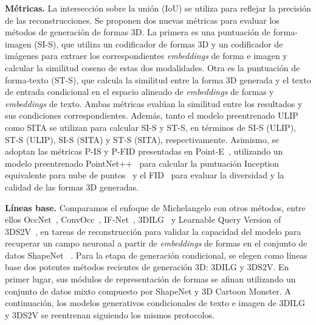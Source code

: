 \documentclass[../../book-main_es.tex]{subfiles}
\begin{document}
\textbf{Métricas.}
La intersección sobre la unión (IoU) se utiliza para reflejar la precisión de
las reconstrucciones. Se proponen dos nuevas métricas para evaluar los métodos de generación de formas 3D.
La primera es una puntuación de forma-imagen (SI-S), que
utiliza un codificador de formas 3D y un codificador de imágenes para extraer los correspondientes
\textit{embeddings} de forma e imagen y calcular la similitud coseno de estas
dos modalidades. Otra es la puntuación de forma-texto (ST-S), que calcula
la similitud entre la forma 3D generada y el texto de entrada condicional
en el espacio alineado de \textit{embeddings} de formas y \textit{embeddings} de texto.
Ambas métricas evalúan la similitud entre los resultados y sus
condiciones correspondientes. Además, tanto el modelo preentrenado
ULIP~\cite{10203465} como SITA se utilizan para calcular SI-S y ST-S, en
términos de SI-S (ULIP), ST-S (ULIP), SI-S (SITA) y ST-S (SITA),
respectivamente. Asimismo, se adoptan las métricas P-IS y P-FID presentadas en
Point-E~\cite{nichol2022point}, utilizando un modelo preentrenado
PointNet++~\cite{NIPS2017_d8bf84be} para calcular la puntuación Inception
equivalente para nube de puntos~\cite{NIPS2016_8a3363ab} y
el FID~\cite{NIPS2017_8a1d6947} para evaluar la diversidad y la calidad de
las formas 3D generadas.

\textbf{Líneas base.}
Comparamos el enfoque de Michelangelo con otros métodos, entre ellos
OccNet~\cite{8953655}, ConvOcc~\cite{10.1007/978-3-030-58580-8_31},
IF-Net~\cite{9156292}, 3DILG~\cite{NEURIPS2022_894ca1c4} y
Learnable Query Version of 3DS2V~\cite{10.1145/3592442},  en
tareas de reconstrucción para validar la capacidad del modelo para recuperar
un campo neuronal a partir de \textit{embeddings} de formas en el conjunto de datos ShapeNet
~\cite{chang2015shapenet}. Para la etapa de generación condicional,
se elegen como líneas base dos potentes métodos recientes de generación 3D: 3DILG y 3DS2V.
En primer lugar, sus módulos de representación de formas se afinan
utilizando un conjunto de datos mixto compuesto por ShapeNet y 3D Cartoon
Monster. A continuación, los modelos generativos condicionales de texto e imagen de
3DILG y 3DS2V se reentrenan siguiendo los mismos protocolos.
\end{document}
